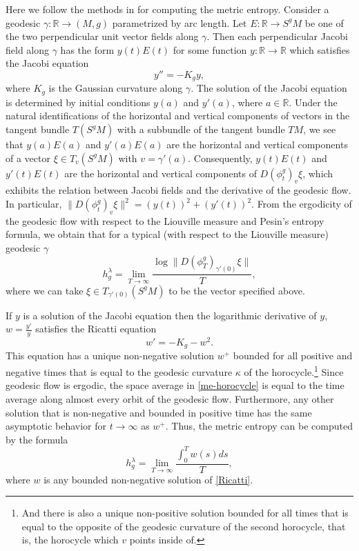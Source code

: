 \documentclass[12pt]{article}
\numberwithin{equation}{section}
\theoremstyle{definition}
\begin{document}
Here we follow the methods in \cite{M81} for computing the metric entropy. Consider a geodesic $\gamma: \mathbb R\rightarrow (M, g)$ parametrized by arc length. Let $E:\mathbb R\rightarrow S^g M$ be one of the two perpendicular unit vector fields along $\gamma$. Then each perpendicular Jacobi field along $\gamma$ has the form  $y(t)E(t)$ for some function $y:\mathbb R\rightarrow\mathbb R$ which satisfies the Jacobi equation 
$$y''=-K_gy,$$ 
where $K_g$ is the Gaussian curvature along $\gamma$. The solution of the Jacobi equation is determined by initial conditions $y(a)$ and $y'(a)$, where $a\in\mathbb R$. Under the natural identifications of the horizontal and vertical components of vectors in the tangent bundle $T(S^gM)$ with a subbundle of the tangent bundle $TM$, we see that $y(a)E(a)$ and $y'(a)E(a)$ are the horizontal and vertical components of a vector $\xi\in T_v(S^gM)$ with $v=\gamma'(a)$. Consequently, $y(t)E(t)$ and $y'(t)E(t)$ are the horizontal and vertical components of $D(\phi^g_t)_v\xi$, which exhibits the relation between  Jacobi fields and the derivative of the geodesic flow. In particular, $\|D(\phi^g_t)_v\xi\|^2 = (y(t))^2+(y'(t))^2$. From the ergodicity of the geodesic flow with respect to the Liouville measure and Pesin's entropy formula, we obtain that for a typical (with respect to the Liouville measure) geodesic $\gamma$
\begin{equation}\label{entropy_Lyapunov_exponent}
h^{\lambda}_g = \lim\limits_{T\rightarrow\infty}\frac{\log\|D(\phi^g_T)_{\gamma'(0)}\xi\|}{T},
\end{equation} 
where we can take $\xi\in T_{\gamma'(0)}(S^gM)$ to be the vector specified above.

If $y$ is a solution of the Jacobi equation then the logarithmic derivative of $y$, $w=\frac{y'}{y}$ satisfies  the Ricatti equation 
\begin{equation}\label{Ricatti}w' = -K_g-w^2.\end{equation} 
This equation has a unique non-negative solution $w^+$ bounded for all positive and negative times that is equal to the geodesic curvature  $\kappa$ of the horocycle.\footnote{And there is also a unique non-positive solution  bounded for all times that is equal to the opposite of the geodesic curvature of the second horocycle, that is, the horocycle which $v$ points inside of.} Since geodesic flow is ergodic, the space average in \eqref{me-horocycle} is equal to the time average along  almost every orbit of the geodesic flow. Furthermore, any other  solution that is non-negative and bounded in positive time has the same asymptotic behavior  for $t\to\infty$ as $w^+$. Thus, the metric entropy can be computed by the formula 
\begin{equation}\label{entropy-Ricatti}
h^\lambda_g = \lim\limits_{T\rightarrow\infty}\frac{\int_0^Tw(s)ds}{T},
\end{equation}
where $w$ is any bounded non-negative solution of \eqref{Ricatti}.
\end{document}
